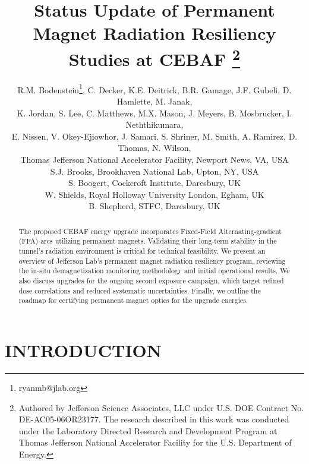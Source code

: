 \documentclass[a4paper,
               ]{jacow}
\begin{document}
\title{Status Update of Permanent Magnet Radiation Resiliency Studies at CEBAF%
\thanks{Authored by Jefferson Science Associates, LLC under U.S. DOE Contract No. DE-AC05-06OR23177. The research described in this work was conducted under the Laboratory Directed Research and Development Program at Thomas Jefferson National Accelerator Facility for the U.S. Department of Energy.}}

\author{R.M. Bodenstein\thanks{ryanmb@jlab.org}, C. Decker, K.E. Deitrick, B.R. Gamage, J.F. Gubeli, D. Hamlette, M. Janak,\\ K. Jordan, S. Lee, C. Matthews, M.X. Mason, J. Meyers, B. Mosbrucker, I. Neththikumara,\\  E. Nissen, V. Okey-Ejiowhor, J. Samari, S. Shriner, M. Smith, A. Ramirez, D. Thomas, N. Wilson,\\ Thomas Jefferson National Accelerator Facility, Newport News, VA, USA \\
S.J. Brooks, Brookhaven National Lab, Upton, NY, USA \\
S. Boogert, Cockcroft Institute, Daresbury, UK\\
W. Shields, Royal Holloway University London, Egham, UK\\
B. Shepherd, STFC, Daresbury, UK
    }

\maketitle

%
\begin{abstract}
The proposed CEBAF energy upgrade incorporates Fixed-Field Alternating-gradient (FFA) arcs utilizing permanent magnets. Validating their long-term stability in the tunnel's radiation environment is critical for technical feasibility. We present an overview of Jefferson Lab's permanent magnet radiation resiliency program, reviewing the in-situ demagnetization monitoring methodology and initial operational results. We also discuss upgrades for the ongoing second exposure campaign, which target refined dose correlations and reduced systematic uncertainties. Finally, we outline the roadmap for certifying permanent magnet optics for the upgrade energies.
\end{abstract}

\section{INTRODUCTION}
\end{document}
